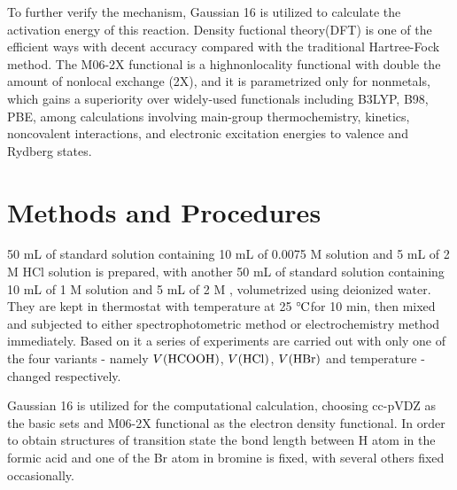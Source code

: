 \documentclass[%
preprint,
 amsmath,amssymb,
 aps,
10.5pt,
]{revtex4-1}
\newcommand{\celsius}{\ensuremath{^\circ\hspace{-0.09em}\mathrm{C}}}
\begin{document}
To further verify the mechanism, Gaussian 16 is utilized to calculate the activation energy of this reaction. Density fuctional theory(DFT) is one of the efficient ways with decent accuracy compared with the traditional Hartree-Fock method. The M06-2X functional is a highnonlocality functional with double the amount of nonlocal exchange (2X), and it is parametrized only for nonmetals, which gains a superiority over widely-used functionals including B3LYP, B98, PBE, among calculations involving main-group thermochemistry, kinetics, noncovalent interactions, and electronic excitation energies to valence and Rydberg states.\cite{zhao2008m06}

\section{Methods and Procedures}
50 mL of standard solution containing 10 mL of 0.0075 M  solution and 5 mL of 2 M HCl solution is prepared, with another 50 mL of standard solution containing 10 mL of 1 M  solution and 5 mL of 2 M , volumetrized using deionized water. They are kept in thermostat with temperature at 25 \celsius for 10 min, then mixed and subjected to either spectrophotometric method or electrochemistry method immediately. Based on it a series of experiments are carried out with only one of the four variants - namely $V(\ce{HCOOH})$, $V(\ce{HCl})$, $V(\ce{HBr})$ and temperature - changed respectively.

Gaussian 16 is utilized for the computational calculation, choosing cc-pVDZ as the basic sets and M06-2X functional as the electron density functional. In order to obtain structures of transition state the bond length between H atom in the formic acid and one of the Br atom in bromine is fixed, with several others fixed occasionally.
\end{document}
